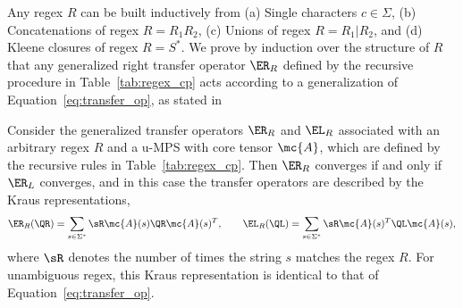 Any regex $R$ can be built inductively from (a) Single characters $c\in\Sigma$, (b) Concatenations of regex $R = R_1 R_2$, (c) Unions of regex $R = R_1 | R_2$, and (d) Kleene closures of regex $R = S^*$. We prove by induction over the structure of $R$ that any generalized right transfer operator $\ER_R$ defined by the recursive procedure in Table~\ref{tab:regex_cp} 
acts according to a generalization of Equation~\ref{eq:transfer_op}, 
as stated in

\begin{theorem}
\label{thm:transfer_op}
Consider the generalized transfer operators $\ER_R$ and $\EL_R$ associated with an arbitrary regex $R$ and a u-MPS with core tensor $\mc{A}$, which are defined by the recursive rules in Table~\ref{tab:regex_cp}. 
Then $\ER_R$ converges if and only if $\ER_L$ converges, and in this case the transfer operators are described by the Kraus representations,
\begin{equation}
\label{eq:gen_transfer_op}
\ER_R(\QR) = \sum_{s\in \Sigma^*} \sR \mc{A}(s) \QR \mc{A}(s)^T, \qquad \EL_R(\QL) = \sum_{s\in \Sigma^*} \sR \mc{A}(s)^T \QL \mc{A}(s),
\end{equation}
where $\sR$ denotes the number of times the string $s$ matches the regex $R$. For unambiguous regex, this Kraus representation is identical to that of Equation~\eqref{eq:transfer_op}.
\end{theorem}

